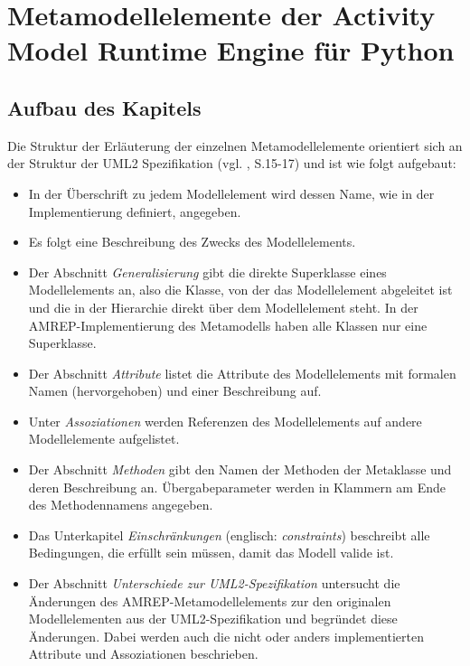 \chapter{Metamodellelemente der Activity Model Runtime Engine für Python}\label{amrep-metamodel-elemente}

\section{Aufbau des Kapitels}
Die Struktur der Erläuterung der einzelnen Metamodellelemente orientiert sich an der Struktur der UML2 Spezifikation (vgl. \citep{OMG2009}, S.15-17) und ist wie folgt aufgebaut:
\begin{itemize}

\item In der Überschrift zu jedem Modellelement wird dessen Name, wie in der Implementierung definiert, angegeben.

\item Es folgt eine Beschreibung des Zwecks des Modellelements.

\item Der Abschnitt \emph{Generalisierung} gibt die direkte Superklasse eines Modellelements an, also die Klasse, von der das Modellelement abgeleitet ist und die in der Hierarchie direkt über dem Modellelement steht. In der AMREP-Implementierung des Metamodells haben alle Klassen nur eine Superklasse.

\item Der Abschnitt \emph{Attribute} listet die Attribute des Modellelements mit formalen Namen (hervorgehoben) und einer Beschreibung auf.

\item Unter \emph{Assoziationen} werden Referenzen des Modellelements auf andere Modellelemente aufgelistet.

\item Der Abschnitt \emph{Methoden} gibt den Namen der Methoden der Metaklasse und deren Beschreibung an. Übergabeparameter werden in Klammern am Ende des Methodennamens angegeben.

\item Das Unterkapitel \emph{Einschränkungen} (englisch: \emph{constraints}) beschreibt alle Bedingungen, die erfüllt sein müssen, damit das Modell valide ist.

\item Der Abschnitt \emph{Unterschiede zur UML2-Spezifikation} untersucht die Änderungen des AMREP-Metamodellelements zur den originalen Modellelementen aus der UML2-Spezifikation und begründet diese Änderungen. Dabei werden auch die nicht oder anders implementierten Attribute und Assoziationen beschrieben.
\end{itemize}

